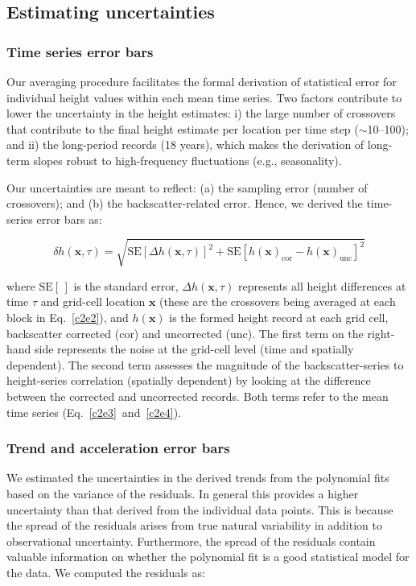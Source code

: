 \subsection{Estimating uncertainties}

\subsubsection{Time series error bars}

\noindent
Our averaging procedure facilitates the formal derivation of statistical error for individual height values within each mean time series. Two factors contribute to lower the uncertainty in the height estimates: i) the large number of crossovers that contribute to the final height estimate per location per time step ($\sim$10--100); and ii) the long-period records (18 years), which makes the derivation of long-term slopes robust to high-frequency fluctuations (e.g., seasonality).

Our uncertainties are meant to reflect: (a) the sampling error (number of crossovers); and (b) the backscatter-related error. Hence, we derived the time-series error bars as:

\begin{equation}
  \delta h(\mathbf x,\tau) = \sqrt{
    \text{SE}[\Delta h(\mathbf x,\tau)]^2
    + \text{SE}[h(\mathbf x)_\text{cor} - h(\mathbf x)_\text{unc}]^2
    }
  \label{c2e7}
\end{equation}

\noindent
where $\text{SE}[\,]$ is the standard error, $\Delta h(\mathbf x,\tau)$ represents all height differences at time $\tau$ and grid-cell location $\mathbf x$ (these are the crossovers being averaged at each block in Eq.~\ref{c2e2}), and $h(\mathbf x)$ is the formed height record at each grid cell, backscatter corrected (cor) and uncorrected (unc). The first term on the right-hand side represents the noise at the grid-cell level (time and spatially dependent). The second term assesses the magnitude of the backscatter-series to height-series correlation (spatially dependent) by looking at the difference between the corrected and uncorrected records. Both terms refer to the mean time series (Eq.~\ref{c2e3}~and~\ref{c2e4}).

\subsubsection{Trend and acceleration error bars}

\noindent
We estimated the uncertainties in the derived trends from the polynomial fits based on the variance of the residuals. In general this provides a higher uncertainty than that derived from the individual data points. This is because the spread of the residuals arises from true natural variability in addition to observational uncertainty. Furthermore, the spread of the residuals contain valuable information on whether the polynomial fit is a good statistical model for the data. We computed the residuals as:

